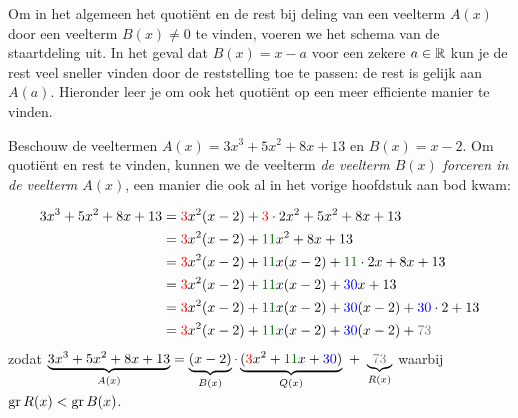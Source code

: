\documentclass{ximera}
\begin{document}
	\author{Koen de Naeghel - Wiskunde Op Maat}
    \xmsource




Om in het algemeen het quotiënt en de rest bij deling van een veelterm \(A(x)\) door een veelterm \(B(x) \neq 0\) te vinden, voeren we het schema van de staartdeling uit. In het geval dat \(B(x) = x-a\) voor een zekere \(a \in \mathbb{R}\) kun je de rest veel sneller vinden door de reststelling toe te passen: de rest is gelijk aan \(A(a)\). Hieronder leer je om ook het quotiënt op een meer efficiente manier te vinden. 

\begin{algorithm} 
Beschouw de veeltermen \(A(x) = 3x^3+5x^2+8x+13\) en \(B(x) = x-2\). Om quotiënt en rest te vinden, kunnen we de veelterm 
\textit{ de veelterm \(B(x)\) forceren in de veelterm \(A(x)\)}, een manier die ook al in het vorige hoofdstuk aan bod kwam:


\begin{align*}
3x^3+5x^2+8x+13
& = {\red{3}}x^2(x-2) + {\red{3}}\cdot 2x^2 + 5x^2 + 8x + 13 \\
& = {\red{3}}x^2(x-2) + {\green{11}}x^2 + 8x + 13 \\
& = {\red{3}}x^2(x-2) + {\green{11}}x(x-2) + {\green{11}}\cdot 2x + 8x + 13 \\
& = {\red{3}}x^2(x-2) + {\green{11}}x(x-2) + {\blue{30}}x + 13 \\
& = {\red{3}}x^2(x-2) + {\green{11}}x(x-2) + {\blue{30}}(x-2) + {\blue{30}} \cdot 2 + 13 \\
& = {\red{3}}x^2(x-2) + {\green{11}}x(x-2) + {\blue{30}}(x-2) + {\gray{73}} %
\end{align*}
zodat \(\D \underbrace{3x^3+5x^2+8x+13}_{A(x)} = \underbrace{(x-2)}_{B(x)}\cdot\underbrace{({\red{3}}x^2 + {\green{11}}x + {\blue{30}})}_{Q(x)} \,\, + \,\, \underbrace{{\gray{73}}}_{R(x)}\) waarbij \(\operatorname{gr} R(x) < \operatorname{gr} B(x)\).


\end{algorithm}
\end{document}
